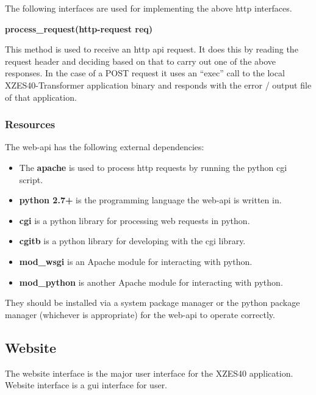 The following interfaces are used for implementing the above \gls{http} interfaces.

\textbf{process\_request(http-request req)}

This method is used to receive an \gls{http} \gls{api} request.
It does this by reading the request header and deciding based on that to carry out one of the above responses.
In the case of a POST request it uses an ``exec'' call to the local XZES40-Transformer application binary and responds with the error / output file of that application.

\subsubsection{Resources}

The \gls{web-api} has the following external dependencies:

\begin{itemize}
  \item The \textbf{\gls{apache}} is used to process \gls{http} requests by running the \gls{python} \gls{cgi} script.
    \item \textbf{\gls{python} 2.7+} is the programming language the \gls{web-api} is written in.
    \item \textbf{cgi} is a \gls{python} library for processing web requests in \gls{python}.
    \item \textbf{cgitb} is a \gls{python} library for developing with the cgi library.
    \item \textbf{mod\_wsgi} is an Apache module for interacting with \gls{python}.
    \item \textbf{mod\_python} is another Apache module for interacting with \gls{python}.
\end{itemize}

They should be installed via a system package manager or the \gls{python} package manager (whichever is appropriate) for the \gls{web-api} to operate correctly.

\subsection{Website}
\label{website}

The website interface is the major user interface for the XZES40 application.
Website interface is a \gls{gui} interface for user.

